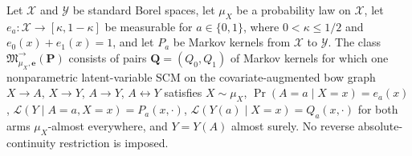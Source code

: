 Let \(\mathcal X\) and \(\mathcal Y\) be standard Borel spaces, let \(\mu_X\) be a probability law on \(\mathcal X\), let \(e_a:\mathcal X\to[\kappa,1-\kappa]\) be measurable for \(a\in\{0,1\}\), where \(0<\kappa\le1/2\) and \(e_0(x)+e_1(x)=1\), and let \(P_a\) be Markov kernels from \(\mathcal X\) to \(\mathcal Y\).  The class \(\mathfrak M^{\to}_{\mu_X,\boldsymbol e}(\boldsymbol P)\) consists of pairs \(\boldsymbol Q=(Q_0,Q_1)\) of Markov kernels for which one nonparametric latent-variable SCM on the covariate-augmented bow graph \(X\to A\), \(X\to Y\), \(A\to Y\), \(A\leftrightarrow Y\) satisfies \(X\sim\mu_X\), \(\Pr(A=a\mid X=x)=e_a(x)\), \(\mathcal L(Y\mid A=a,X=x)=P_a(x,\cdot)\), \(\mathcal L(Y(a)\mid X=x)=Q_a(x,\cdot)\) for both arms \(\mu_X\)-almost everywhere, and \(Y=Y(A)\) almost surely.  No reverse absolute-continuity restriction is imposed.